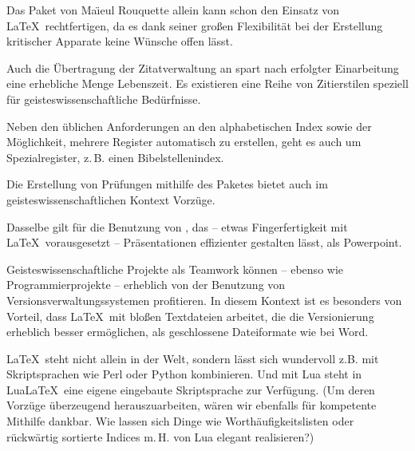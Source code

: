 \documentclass[ngerman]{dtk}
\begin{document}

Das Paket  von Ma\"{\i}eul Rouquette allein kann schon den
Einsatz von \LaTeX\ rechtfertigen, da es dank seiner großen Flexibilität 
bei der Erstellung kritischer Apparate keine Wünsche offen lässt.


Auch die Übertragung der Zitatverwaltung an  spart nach erfolgter Einarbeitung eine erhebliche
Menge Lebenszeit. Es existieren eine Reihe von Zitierstilen speziell für geisteswissenschaftliche Bedürfnisse.


Neben den üblichen Anforderungen an den alphabetischen Index sowie der Möglichkeit, mehrere Register
automatisch zu erstellen, geht es auch um Spezialregister, z.\,B. einen Bibelstellenindex.


Die Erstellung von Prüfungen mithilfe des Paketes  bietet auch im geisteswissenschaftlichen
Kontext Vorzüge.


Dasselbe gilt für die Benutzung von , das -- etwas Fingerfertigkeit mit \LaTeX\ vorausgesetzt --
Präsentationen effizienter gestalten lässt, als Powerpoint.


Geisteswissenschaftliche Projekte als Teamwork können -- ebenso wie Programmierprojekte -- erheblich von
der Benutzung von Versionsverwaltungssystemen profitieren.
In diesem Kontext ist es besonders von Vorteil, dass \LaTeX\ mit bloßen Textdateien arbeitet, die die
Versionierung erheblich besser ermöglichen, als geschlossene Dateiformate wie bei Word.


\LaTeX\ steht nicht allein in der Welt, sondern lässt sich wundervoll z.B. mit Skriptsprachen wie Perl oder
Python kombinieren. Und mit Lua steht in Lua\LaTeX\ eine eigene eingebaute Skriptsprache zur Verfügung.
(Um deren Vorzüge überzeugend herauszuarbeiten, wären wir ebenfalls für kompetente Mithilfe dankbar.
Wie lassen sich Dinge wie Worthäufigkeitslisten oder rückwärtig sortierte Indices m.\,H. von Lua elegant
realisieren?)
\end{document}
